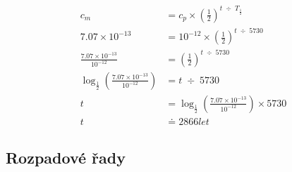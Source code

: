 \begin{align*}
    c_{m} &= c_{p} \times \left(\frac{1}{2}\right)^{t \; \div \;  T_{\frac{1}{2}}} \\
    7.07 \times 10^{-13} &= 10^{-12} \times \left(\frac{1}{2}\right)^{t \; \div \;  5730} \\
    \frac{7.07 \times 10^{-13}}{10^{-12}} &= \left(\frac{1}{2}\right)^{t \; \div \;  5730} \\
    \log_{\frac{1}{2}}\left(\frac{7.07 \times 10^{-13}}{10^{-12}}\right) &= t \; \div \;  5730 \\
    t &= \log_{\frac{1}{2}}\left(\frac{7.07 \times 10^{-13}}{10^{-12}}\right) \times 5730 \\
    t &\doteq 2866 let
\end{align*}

\subsection{Rozpadové řady}
